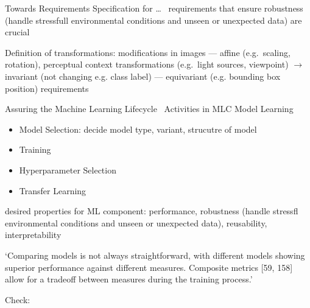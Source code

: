 Towards Requirements Specification for \ldots~\cite{hu_towards_2020}
requirements that ensure robustness (handle stressfull environmental conditions and unseen or
unexpected data) are crucial

Definition of transformations: modifications in images
--- affine (e.g.\ scaling, rotation), perceptual context transformations (e.g.\ light sources, viewpoint)
$\rightarrow$ invariant (not changing e.g. class label) --- equivariant (e.g. bounding
                box position) requirements

Assuring the Machine Learning Lifecycle~\cite{ashmore_assuring_2021}
Activities in MLC Model Learning
\begin{itemize}
    \item Model Selection: decide model type, variant, strucutre of model
    \item Training
    \item Hyperparameter Selection
    \item Transfer Learning
\end{itemize}

desired properties for ML component: performance, robustness (handle stressfl environmental
conditions and unseen or unexpected data), reusability, interpretability

`Comparing models is not always straightforward, with different models showing superior performance
against different measures. Composite metrics [59, 158] allow for a tradeoff between measures
during the training process.'

Check:~\cite{hu_towards_2020, belani_requirements_2019, siebert_construction_2021, nakamichi_requirements-driven_2020, ishikawa_evidence-driven_2020}

